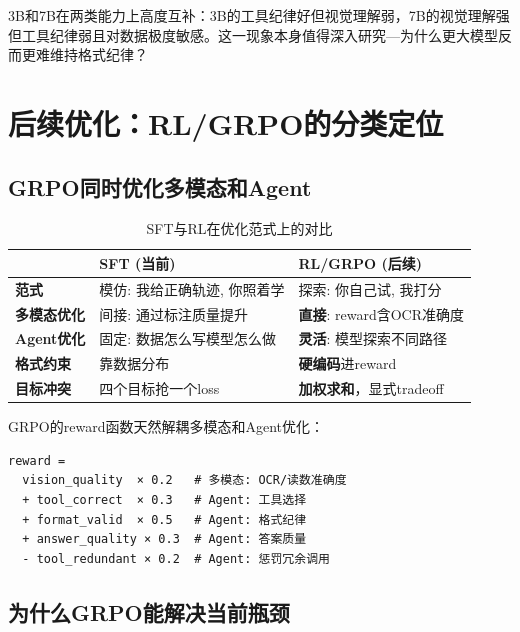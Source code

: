 \documentclass[fontset=none,11pt,a4paper]{ctexart}
\begin{document}
3B和7B在两类能力上高度互补：3B的工具纪律好但视觉理解弱，7B的视觉理解强但工具纪律弱且对数据极度敏感。这一现象本身值得深入研究---为什么更大模型反而更难维持格式纪律？

\section{后续优化：RL/GRPO的分类定位}

\subsection{GRPO同时优化多模态和Agent}

\begin{table}[htbp]
\centering
\begin{tabular}{lp{4cm}p{4cm}}
\toprule
 & SFT (当前) & RL/GRPO (后续) \\
\midrule
\textbf{范式} & 模仿: 我给正确轨迹, 你照着学 & 探索: 你自己试, 我打分 \\
\textbf{多模态优化} & 间接: 通过标注质量提升 & \textbf{直接}: reward含OCR准确度 \\
\textbf{Agent优化} & 固定: 数据怎么写模型怎么做 & \textbf{灵活}: 模型探索不同路径 \\
\textbf{格式约束} & 靠数据分布 & \textbf{硬编码}进reward \\
\textbf{目标冲突} & 四个目标抢一个loss & \textbf{加权求和}，显式tradeoff \\
\bottomrule
\end{tabular}
\caption{SFT与RL在优化范式上的对比}
\label{tab:sft_vs_rl}
\end{table}

GRPO的reward函数天然解耦多模态和Agent优化：

\begin{verbatim}
reward =
  vision_quality  × 0.2   # 多模态: OCR/读数准确度
  + tool_correct  × 0.3   # Agent: 工具选择
  + format_valid  × 0.5   # Agent: 格式纪律
  + answer_quality × 0.3  # Agent: 答案质量
  - tool_redundant × 0.2  # Agent: 惩罚冗余调用
\end{verbatim}

\subsection{为什么GRPO能解决当前瓶颈}
\end{document}
